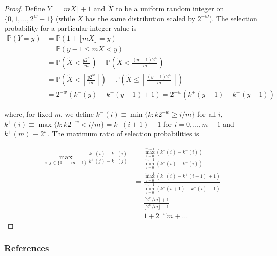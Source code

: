 \documentclass{beamer}
\newcommand{\todo}[1]{{\color{red}{TO DO: \sc #1}}}
\newcommand{\pr}{\mathbb{P}} %
\begin{document}
\begin{frame}[label = nonuniform-proof]
\tiny
\begin{proof}
Define $Y = \lfloor mX \rfloor + 1$ and $\tilde{X}$ to be a uniform random integer on $\{0, 1, \dots, 2^w - 1\}$ (while $X$ has the same distribution scaled by $2^{-w}$).
The selection probability for a particular integer value is 
\begin{align*}
\pr\left(Y = y\right) &= \pr\left(1 + \lfloor mX \rfloor = y\right) \\
&= \pr\left(y-1 \leq mX < y\right) \\
&= \pr\left(\tilde{X} < \frac{y2^w}{m}\right) - \pr\left(\tilde{X} < \frac{(y-1)2^w}{m}\right)\\
&= \pr\left(\tilde{X} < \left\lceil\frac{y2^w}{m}\right\rceil\right) - \pr\left(\tilde{X} \leq \left\lceil\frac{(y-1)2^w}{m}\right\rceil\right)\\
&= 2^{-w}\left(k^-(y)- k^-(y-1) + 1\right) = 2^{-w}\left(k^+(y-1)- k^-(y-1) \right)
\end{align*}

\noindent where, for fixed $m$, we define $k^-(i) \equiv \min \{k: k2^{-w} \geq i/m\}$ for all $i$,
$k^+(i) \equiv \max \{k : k2^{-w} < i/m \} = k^-(i+1)-1$ for $i = 0, \dots, m-1$
and $k^+(m) \equiv 2^w$.
The maximum ratio of selection probabilities is 

\begin{align*}
\max_{i, j \in \{0, \ldots, m-1\}} \frac{k^+(i) - k^-(i)}{k^+(j) - k^-(j)}
&= \frac{ \max_{i=0}^{m-1} (k^+(i) - k^-(i))}{\min_{i=0}^{m-1} (k^+(i) - k^-(i))} \\
&= \frac{ \max_{i=0}^{m-1} (k^+(i) - k^+(i+1) + 1)}{\min_{i=0}^{m-1} (k^-(i+1) - k^-(i) -1)} \\
&= \frac{\lceil 2^w/m \rceil + 1}{\lfloor 2^w/m \rfloor - 1} \\
&= 1 + 2^{-w}m + ...
\end{align*}

\end{proof}
\hyperlink{nonuniform-lemma}{}

\end{frame}


\begin{frame}\label{sha256_tests}

\todo{Insert table of p-values for several tests + several seeds}
\hyperlink{sha256_procedure}{}

\end{frame}



\begin{frame}
\frametitle{References}
\tiny


\itemize
\end{frame}
\end{document}
